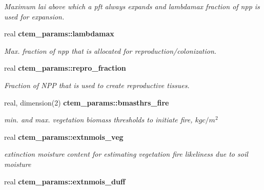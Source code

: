 \begin{DoxyCompactItemize}
\begin{DoxyCompactList}\small\item\em Maximum lai above which a pft always expands and lambdamax fraction of npp is used for expansion. \end{DoxyCompactList}\item 
\hypertarget{namespacectem__params_ae7cc598974253bc2df0aeaed4ffea891}{}real {\bfseries ctem\+\_\+params\+::lambdamax}\label{namespacectem__params_ae7cc598974253bc2df0aeaed4ffea891}

\begin{DoxyCompactList}\small\item\em Max. fraction of npp that is allocated for reproduction/colonization. \end{DoxyCompactList}\item 
\hypertarget{namespacectem__params_a4b02c06a75e1eba7cae5f864b099bb0d}{}real {\bfseries ctem\+\_\+params\+::repro\+\_\+fraction}\label{namespacectem__params_a4b02c06a75e1eba7cae5f864b099bb0d}

\begin{DoxyCompactList}\small\item\em Fraction of N\+P\+P that is used to create reproductive tissues. \end{DoxyCompactList}\item 
\hypertarget{namespacectem__params_a62e7197e6f7c9c31dc86998dc8c9ebf2}{}real, dimension(2) {\bfseries ctem\+\_\+params\+::bmasthrs\+\_\+fire}\label{namespacectem__params_a62e7197e6f7c9c31dc86998dc8c9ebf2}

\begin{DoxyCompactList}\small\item\em min. and max. vegetation biomass thresholds to initiate fire, $kg c/m^2$ \end{DoxyCompactList}\item 
\hypertarget{namespacectem__params_a79ef480de23397cf798e7350991780f3}{}real {\bfseries ctem\+\_\+params\+::extnmois\+\_\+veg}\label{namespacectem__params_a79ef480de23397cf798e7350991780f3}

\begin{DoxyCompactList}\small\item\em extinction moisture content for estimating vegetation fire likeliness due to soil moisture \end{DoxyCompactList}\item 
\hypertarget{namespacectem__params_a5783396d006dd77848beec6e321443b7}{}real {\bfseries ctem\+\_\+params\+::extnmois\+\_\+duff}\label{namespacectem__params_a5783396d006dd77848beec6e321443b7}


\end{DoxyCompactItemize}

